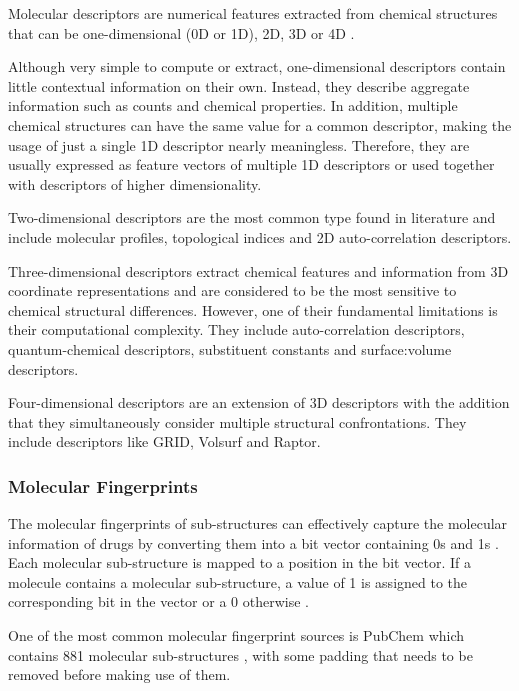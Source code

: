 Molecular descriptors are numerical features extracted from chemical structures that can be one-dimensional (0D or 1D), 2D, 3D or 4D \citep{Lo2018}.

Although very simple to compute or extract, one-dimensional descriptors contain little contextual information on their own. Instead, they describe aggregate information such as counts and chemical properties. In addition, multiple chemical structures can have the same value for a common descriptor, making the usage of just a single 1D descriptor nearly meaningless. Therefore, they are usually expressed as feature vectors of multiple 1D descriptors or used together with descriptors of higher dimensionality.

Two-dimensional descriptors are the most common type found in literature and include molecular profiles, topological indices and 2D auto-correlation descriptors. 

Three-dimensional descriptors extract chemical features and information from 3D coordinate representations and are considered to be the most sensitive to chemical structural differences. However, one of their fundamental limitations is their computational complexity. They include auto-correlation descriptors, quantum-chemical descriptors, substituent constants and surface:volume descriptors. 

Four-dimensional descriptors are an extension of 3D descriptors with the addition that they simultaneously consider multiple structural confrontations. They include descriptors like GRID, Volsurf and Raptor.

\subsubsection{Molecular Fingerprints}

The molecular fingerprints of sub-structures can effectively capture the molecular information of drugs by converting them into a bit vector containing 0s and 1s \citep{Wang2020}. Each molecular sub-structure is mapped to a position in the bit vector. If a molecule contains a molecular sub-structure, a value of 1 is assigned to the corresponding bit in the vector or a 0 otherwise \citep{PubChem_Fingerprints}. 

One of the most common molecular fingerprint sources is PubChem \citep{PubChem} which contains 881 molecular sub-structures \citep{PubChem_Fingerprints}, with some padding that needs to be removed before making use of them. 

\hspace{1cm}

